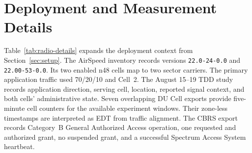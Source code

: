 \section{Deployment and Measurement Details}
\label{app:setup}

Table~\ref{tab:radio-details} expands the deployment context from
Section~\ref{sec:setup}. The AirSpeed inventory records versions
\texttt{22.0-24-0.0} and \texttt{22.00-53-0.0}. Its two
enabled n48 cells map to two sector carriers. The primary application traffic
used 70/20/10 and Cell~2. The August 15--19 TDD study records application
direction, serving cell, location, reported signal context, and both cells'
administrative state. Seven overlapping DU Cell exports provide five-minute
cell counters for the available experiment windows. Their zone-less timestamps
are interpreted as EDT from traffic alignment. The CBRS export records
Category~B General Authorized Access
operation, one requested and authorized grant, no suspended grant, and a
successful Spectrum Access System heartbeat.

